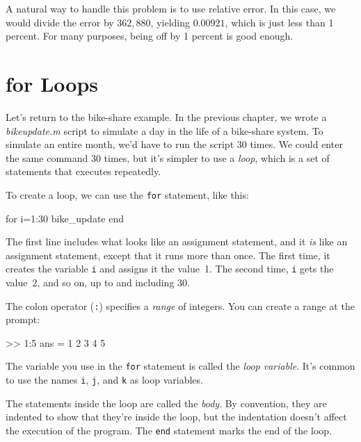 A natural way to handle this problem is to use relative
error.
In this case, we would divide the error
by $362,880$, yielding $0.00921$, which is just less than 1 percent.
For many purposes, being off by 1 percent is good enough.


\section{for Loops}


Let's return to the bike-share example.
In the previous chapter, we wrote a \emph{bike\textunderscore update.m} script to simulate a
day in the life of a bike-share system. To simulate an entire
month, we'd have to run the script 30 times. We could enter the same command 30 times, but it's simpler to use a \emph{loop}, which is a set of statements that executes repeatedly.

To create a loop, we can use the \lstinline{for} statement, like this:

\begin{code}
for i=1:30
    bike_update
end
\end{code}

The first line includes what looks like an assignment statement, and it \emph{is}
like an assignment statement, except that it runs more than once.  The
first time, it creates the variable \lstinline{i} and assigns it the
value~1.  The second time, \lstinline{i} gets the value~2, and so on, up to
and including 30.


The colon operator (\lstinline{:}) specifies a \emph{range} of integers.
You can create a range at the prompt:

\begin{code}
>> 1:5
ans =  1     2     3     4     5
\end{code}

The variable you use in the \lstinline{for} statement is called the \emph{loop
variable}.  It's common to use the names \lstinline{i},
\lstinline{j}, and \lstinline{k} as loop variables.


The statements inside the loop are called the \emph{body}.  By convention,
they are indented to show that they're inside the loop, but the
indentation doesn't affect the execution of the program.
The \lstinline{end} statement marks the end of the loop.

